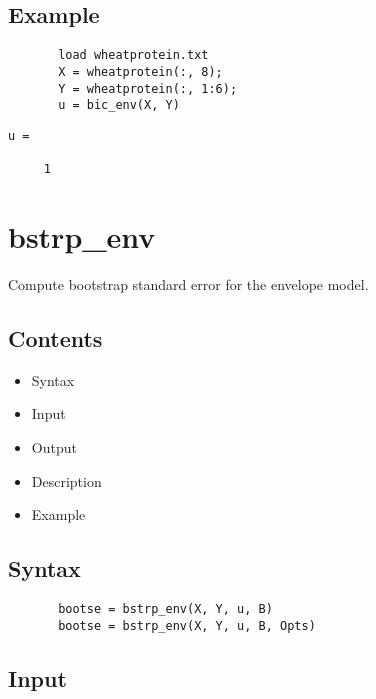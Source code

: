 \documentclass[a4paper,11pt,openany]{memoir}
\begin{document}
\subsection*{Example}


\begin{verbatim}       load wheatprotein.txt
       X = wheatprotein(:, 8);
       Y = wheatprotein(:, 1:6);
       u = bic_env(X, Y)\end{verbatim}
    
        \color{lightgray}\ttfamily \begin{verbatim}
u =

     1

\end{verbatim} \rmfamily
\color{black}
 
 
 \newpage

\rmfamily
\color{black}\section{bstrp\_env}

\begin{par}
Compute bootstrap standard error for the envelope model.
\end{par} \vspace{1em}

\subsection*{Contents}

\begin{itemize}
\setlength{\itemsep}{-1ex}
   \item Syntax
   \item Input
   \item Output
   \item Description
   \item Example
\end{itemize}


\subsection*{Syntax}


\begin{verbatim}       bootse = bstrp_env(X, Y, u, B)
       bootse = bstrp_env(X, Y, u, B, Opts)\end{verbatim}
    

\subsection*{Input}
\end{document}
